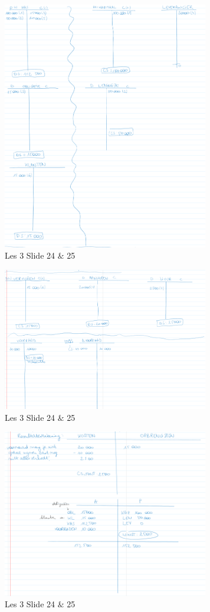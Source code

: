 \documentclass[10pt,a4paper]{report}
\begin{document}
\begin{figure}[h!]
\centering
\includegraphics[width=90mm]{Les03_04.png}
\caption{Les 3 Slide 24 $\&$ 25} 
\label{les03_04}
\end{figure}

\begin{figure}[h!]
\centering
\includegraphics[width=90mm]{Les03_05.png}
\caption{Les 3 Slide 24 $\&$ 25} 
\label{les03_05}
\end{figure}

\begin{figure}[h!]
\centering
\includegraphics[width=90mm]{Les03_06.png}
\caption{Les 3 Slide 24 $\&$ 25} 
\label{les03_06}
\end{figure}
\end{document}
